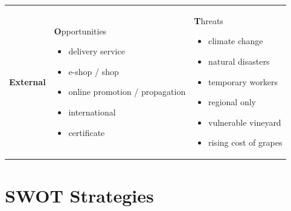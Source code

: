 \documentclass[11pt,a4paper]{article}
\begin{document}
\begin{table}[H]
\begin{center}
\begin{tabular}{r|p{}|p{}}
        \multirow{16}{*}[1em]{\textbf{\large{External}}}
        &
        \begin{center}
            \textbf{O}pportunities
        \end{center}
        \begin{itemize}
            \item delivery service
            \item e-shop / shop
            \item online promotion / propagation
            \item international
            \item certificate
        \end{itemize}
        &
        \begin{center}
            \textbf{T}hreats
        \end{center}
        \begin{itemize}
            \item climate change
            \item natural disasters
            \item temporary workers
            \item regional only
            \item vulnerable vineyard
            \item rising cost of grapes
        \end{itemize}
        \\
    \end{tabular}
  \end{center}
\end{table}

\section{SWOT Strategies}
\end{document}
